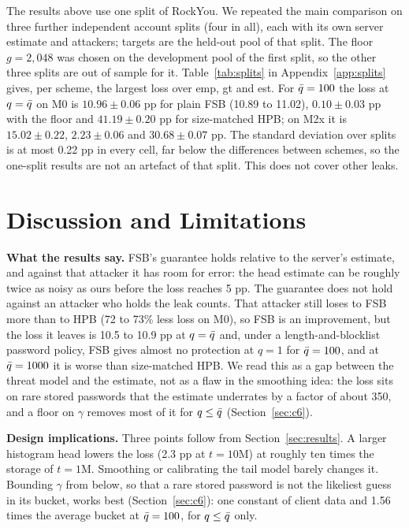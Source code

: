 The results above use one split of RockYou. We repeated the main comparison on three further independent account splits (four in all), each with its own server estimate and attackers; targets are the held-out pool of that split. The floor $g=2{,}048$ was chosen on the development pool of the first split, so the other three splits are out of sample for it. Table~\ref{tab:splits} in Appendix~\ref{app:splits} gives, per scheme, the largest loss over emp, gt and est. For $\bar q=100$ the loss at $q=\bar q$ on M0 is $10.96\pm0.06$ pp for plain FSB (10.89 to 11.02), $0.10\pm0.03$ pp with the floor and $41.19\pm0.20$ pp for size-matched HPB; on M2x it is $15.02\pm0.22$, $2.23\pm0.06$ and $30.68\pm0.07$ pp. The standard deviation over splits is at most 0.22 pp in every cell, far below the differences between schemes, so the one-split results are not an artefact of that split. This does not cover other leaks.

\section{Discussion and Limitations}\label{sec:disc}

\textbf{What the results say.} FSB's guarantee holds relative to the server's estimate, and against that attacker it has room for error: the head estimate can be roughly twice as noisy as ours before the loss reaches 5 pp. The guarantee does not hold against an attacker who holds the leak counts. That attacker still loses to FSB more than to HPB (72 to 73\% less loss on M0), so FSB is an improvement, but the loss it leaves is 10.5 to 10.9 pp at $q=\bar q$ and, under a length-and-blocklist password policy, FSB gives almost no protection at $q=1$ for $\bar q=100$, and at $\bar q=1000$ it is worse than size-matched HPB. We read this as a gap between the threat model and the estimate, not as a flaw in the smoothing idea: the loss sits on rare stored passwords that the estimate underrates by a factor of about 350, and a floor on $\gamma$ removes most of it for $q\le\bar q$ (Section~\ref{sec:c6}).

\textbf{Design implications.} Three points follow from Section~\ref{sec:results}. A larger histogram head lowers the loss (2.3 pp at $t=10$M) at roughly ten times the storage of $t=1$M. Smoothing or calibrating the tail model barely changes it. Bounding $\gamma$ from below, so that a rare stored password is not the likeliest guess in its bucket, works best (Section~\ref{sec:c6}): one constant of client data and 1.56 times the average bucket at $\bar q=100$, for $q\le\bar q$ only.

